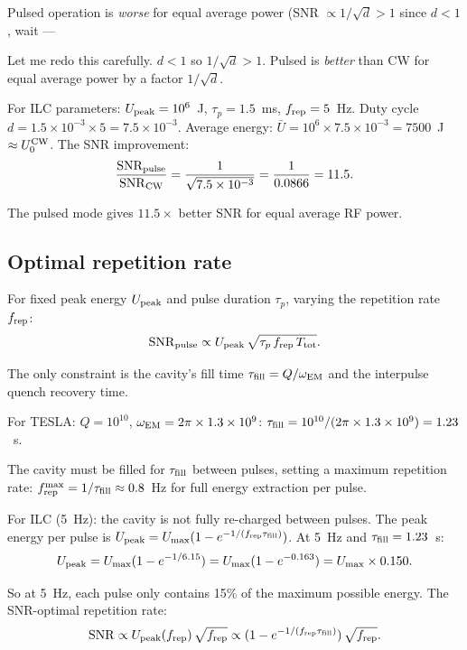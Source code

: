 \documentclass[11pt]{article}
\newcommand{\ee}[1]{\times 10^{#1}}
\begin{document}
Pulsed operation is \emph{worse} for equal average power (SNR $\propto 1/\sqrt{d}
> 1$ since $d < 1$, wait ---

Let me redo this carefully. $d < 1$ so $1/\sqrt{d} > 1$. Pulsed is \emph{better}
than CW for equal average power by a factor $1/\sqrt{d}$.

For ILC parameters: $U_{\rm peak} = 10^6$~J, $\tau_p = 1.5$~ms,
$f_{\rm rep} = 5$~Hz. Duty cycle $d = 1.5\ee{-3} \times 5 = 7.5\ee{-3}$.
Average energy: $\bar{U} = 10^6 \times 7.5\ee{-3} = 7500$~J $\approx U_0^{\rm CW}$.
The SNR improvement:
\begin{equation}
\frac{{\rm SNR}_{\rm pulse}}{{\rm SNR}_{\rm CW}}
= \frac{1}{\sqrt{7.5\ee{-3}}} = \frac{1}{0.0866} = 11.5.
\end{equation}

The pulsed mode gives $11.5\times$ better SNR for equal average RF power.

\subsection{Optimal repetition rate}

For fixed peak energy $U_{\rm peak}$ and pulse duration $\tau_p$, varying the
repetition rate $f_{\rm rep}$:
\begin{equation}
{\rm SNR}_{\rm pulse} \propto U_{\rm peak}\,\sqrt{\tau_p\,f_{\rm rep}\,T_{\rm tot}}.
\end{equation}

The only constraint is the cavity's fill time $\tau_{\rm fill} = Q/\omega_{\rm EM}$
and the interpulse quench recovery time.

For TESLA: $Q = 10^{10}$, $\omega_{\rm EM} = 2\pi \times 1.3\ee{9}$:
$\tau_{\rm fill} = 10^{10}/(2\pi \times 1.3\ee{9}) = 1.23$~s.

The cavity must be filled for $\tau_{\rm fill}$ between pulses, setting a maximum
repetition rate: $f_{\rm rep}^{\rm max} = 1/\tau_{\rm fill} \approx 0.8$~Hz for
full energy extraction per pulse.

For ILC (5~Hz): the cavity is not fully re-charged between pulses. The peak
energy per pulse is $U_{\rm peak} = U_{\rm max}(1 - e^{-1/(f_{\rm rep}\tau_{\rm fill})})$.
At 5~Hz and $\tau_{\rm fill} = 1.23$~s:
\begin{equation}
U_{\rm peak} = U_{\rm max}(1 - e^{-1/6.15}) = U_{\rm max}(1 - e^{-0.163})
= U_{\rm max} \times 0.150.
\end{equation}

So at 5~Hz, each pulse only contains 15\% of the maximum possible energy.
The SNR-optimal repetition rate:
\begin{equation}
{\rm SNR} \propto U_{\rm peak}(f_{\rm rep})\,\sqrt{f_{\rm rep}}
\propto (1 - e^{-1/(f_{\rm rep}\tau_{\rm fill})})\,\sqrt{f_{\rm rep}}.
\end{equation}
\end{document}
